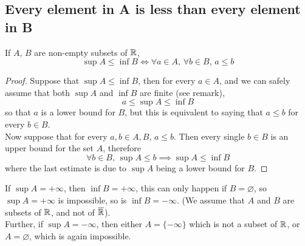 \documentclass[../../main.tex]{subfiles}
\begin{document}
\subsection{Every element in A is less than every element in B}
\begin{wts}\label{lemma: a leq b for every a and b}
    If $A$, $B$ are non-empty subsets of $\mathbb{R}$,
    \[
    \sup A\leq \inf B \iff \forall a\in A,\,\forall b\in B,\, a\leq b
    \]
\end{wts}
\begin{proof}
    Suppose that $\sup A\leq \inf B$, then for every $a\in A$, and we can safely assume that both $\sup A$ and $\inf B$ are finite (see remark),
    \[
    a\leq \sup A\leq \inf B
    \]
    so that $a$ is a lower bound for $B$, but this is equivalent to saying that $a\leq b$ for every $b\in B$.\\
    
    Now suppose that for every $a,b\in A,B$, $a\leq b$. Then every single $b\in B$ is an upper bound for the set $A$, therefore
    \[
    \forall b\in B,\, \sup A\leq b\implies \sup A\leq \inf B
    \]
    where the last estimate is due to $\sup A$ being a lower bound for $B$.
\end{proof}
\begin{remark}
    If $\sup A = +\infty$, then $\inf B = +\infty$, this can only happen if $B=\varnothing$, so $\sup A = +\infty$ is impossible, so is $\inf B = -\infty$. (We assume that $A$ and $B$ are subsets of $\mathbb{R}$, and not of $\overline{\mathbb{R}}$).\\
    
    Further, if $\sup A = -\infty$, then either $A=\{-\infty\}$ which is not a subset of $\mathbb{R}$, or $A=\varnothing$, which is again impossible.
\end{remark}
\end{document}
